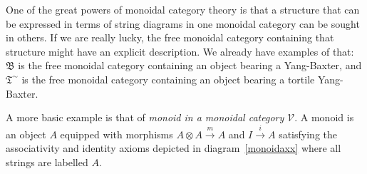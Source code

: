 \documentclass[a4paper,12pt]{article}
\theoremstyle{step}
\newcommand{\xra}{\xrightarrow}
\def\CV{{\mathscr V}}
\def\ot{{\otimes}}
\begin{document}
One of the great powers of monoidal category theory is that a structure that 
can be expressed in terms of string diagrams in one monoidal category can be sought in others.
If we are really lucky, the free monoidal category containing that structure might have an
explicit description. We already have examples of that: $\mathfrak{B}$ is the free monoidal
category containing an object bearing a Yang-Baxter, and $\mathfrak{T}^{\sim}$ is the free monoidal
category containing an object bearing a tortile Yang-Baxter. 

A more basic example is that of {\em monoid in a monoidal category $\CV$}. A monoid is an object $A$
equipped with morphisms $A\ot A\xra{m} A$ and $I\xra{i} A$ satisfying the associativity and identity
axioms depicted in diagram~\eqref{monoidaxx} where all strings are labelled $A$.
\end{document}
